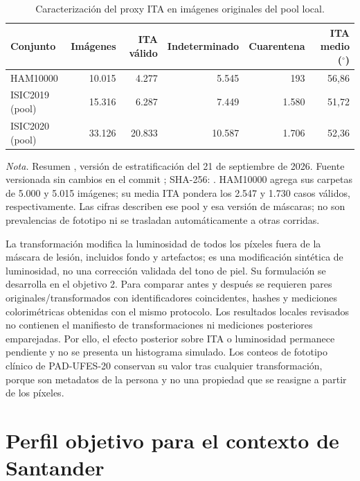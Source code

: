 \begin{table}[htbp]
\centering
\caption{Caracterización del proxy ITA en imágenes originales del pool local.}
\label{tab:ita-originales}
\begin{tabular}{lrrrrr}
\toprule
Conjunto & Imágenes & ITA válido & Indeterminado & Cuarentena & ITA medio ($^\circ$) \\
\midrule
HAM10000 & 10.015 & 4.277 & 5.545 & 193 & 56,86 \\
ISIC2019 (pool) & 15.316 & 6.287 & 7.449 & 1.580 & 51,72 \\
ISIC2020 (pool) & 33.126 & 20.833 & 10.587 & 1.706 & 52,36 \\
\bottomrule
\end{tabular}
\end{table}
\noindent\textit{Nota.} Resumen , versión de estratificación del 21 de septiembre de 2026. Fuente versionada sin cambios en el commit ; SHA-256: . HAM10000 agrega sus carpetas de 5.000 y 5.015 imágenes; su media ITA pondera los 2.547 y 1.730 casos válidos, respectivamente. Las cifras describen ese pool y esa versión de máscaras; no son prevalencias de fototipo ni se trasladan automáticamente a otras corridas.

La transformación modifica la luminosidad de todos los píxeles fuera de la máscara de lesión, incluidos fondo y artefactos; es una modificación sintética de luminosidad, no una corrección validada del tono de piel. Su formulación se desarrolla en el objetivo 2. Para comparar antes y después se requieren pares originales/transformados con identificadores coincidentes, hashes y mediciones colorimétricas obtenidas con el mismo protocolo. Los resultados locales revisados no contienen el manifiesto de transformaciones ni mediciones posteriores emparejadas. Por ello, el efecto posterior sobre ITA o luminosidad permanece pendiente y no se presenta un histograma simulado. Los conteos de fototipo clínico de PAD-UFES-20 conservan su valor tras cualquier transformación, porque son metadatos de la persona y no una propiedad que se reasigne a partir de los píxeles.

\section{Perfil objetivo para el contexto de Santander}

